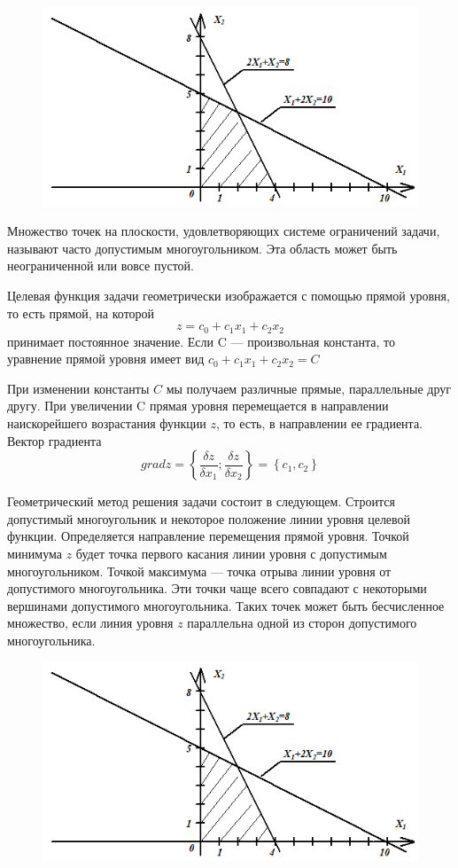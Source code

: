 \begin{figure}
  \centering
  \includegraphics[width=0.7\linewidth]{pictures/picturefile_1_1}
  \caption{}
  \label{fig:grafic1}
\end{figure}

Множество точек на плоскости, удовлетворяющих системе ограничений задачи, называют часто допустимым многоугольником. Эта область может быть неограниченной или вовсе пустой.

Целевая функция задачи геометрически изображается с помощью прямой уровня, то есть прямой, на которой\\
$$z = c_{0}+c_{1}x_{1} + c_{2}x_{2}$$
принимает постоянное значение. Если C — произвольная константа, то уравнение прямой уровня имеет вид $c_{0}+c_{1}x_{1} + c_{2}x_{2} = C$

При изменении константы $C$ мы получаем различные прямые, параллельные друг другу. При увеличении C прямая уровня перемещается в направлении наискорейшего возрастания функции $z$, то есть, в направлении ее градиента. Вектор градиента\\
$$grad z = \left\{\frac{\delta z}{\delta x_{1}};\frac{\delta z}{\delta x_{2}}\right\} = \left\{c_{1},c_{2}\right\}$$

Геометрический метод решения задачи состоит в следующем. Строится допустимый многоугольник и некоторое положение линии уровня целевой функции. Определяется направление перемещения прямой уровня. Точкой минимума $z$  будет точка первого касания линии уровня с допустимым многоугольником. Точкой максимума — точка отрыва линии уровня от допустимого многоугольника. Эти  точки чаще всего совпадают с некоторыми вершинами допустимого  многоугольника. Таких точек может быть бесчисленное множество, если линия уровня $z$ параллельна одной из сторон допустимого многоугольника.


\begin{figure}
\centering
\includegraphics[width=0.7\linewidth]{pictures/picturefile_1_1}
\caption{}
\label{fig:grafic2}
\end{figure}

